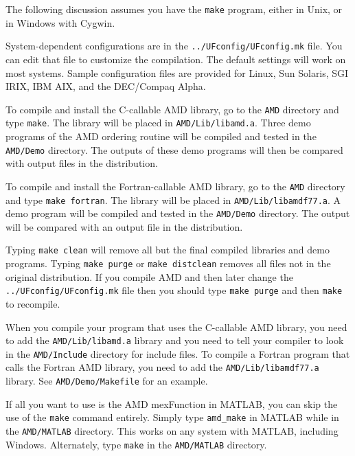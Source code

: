 \documentclass[11pt]{article}
\begin{document}
The following discussion assumes you have the {\tt make} program, either in
Unix, or in Windows with Cygwin.

System-dependent configurations are in the {\tt ../UFconfig/UFconfig.mk}
file.  You can edit that file to customize the compilation.  The default
settings will work on most systems.
Sample configuration files are provided
for Linux, Sun Solaris, SGI IRIX, IBM AIX, and the DEC/Compaq Alpha.

To compile and install the C-callable AMD library,
go to the {\tt AMD} directory and type {\tt make}.
The library will be placed in {\tt AMD/Lib/libamd.a}.
Three demo programs of the AMD ordering routine will be compiled and tested in
the {\tt AMD/Demo} directory.
The outputs of these demo programs will then be compared with output
files in the distribution.

To compile and install the Fortran-callable AMD library,
go to the {\tt AMD} directory and type {\tt make fortran}.
The library will be placed in {\tt AMD/Lib/libamdf77.a}.
A demo program will be compiled and tested in the {\tt AMD/Demo} directory.
The output will be compared with an output file in the distribution.

Typing {\tt make clean} will remove all but the final compiled libraries
and demo programs.  Typing {\tt make purge} or {\tt make distclean}
removes all files not in the original distribution.
If you compile AMD and then later change the {\tt ../UFconfig/UFconfig.mk} file
then you should type {\tt make purge} and then {\tt make} to recompile.

When you compile your program that uses the C-callable AMD library,
you need to add the {\tt AMD/Lib/libamd.a} library
and you need to tell your compiler to look in the
{\tt AMD/Include} directory for include
files.   To compile a Fortran program that calls the Fortran AMD library,
you need to add the {\tt AMD/Lib/libamdf77.a} library.
See {\tt AMD/Demo/Makefile} for an example.

If all you want to use is the AMD mexFunction in MATLAB, you can skip
the use of the {\tt make} command entirely.  Simply type
{\tt amd\_make} in MATLAB while in the {\tt AMD/MATLAB} directory.
This works on any system with MATLAB, including Windows.
Alternately, type {\tt make} in the {\tt AMD/MATLAB} directory.
\end{document}
